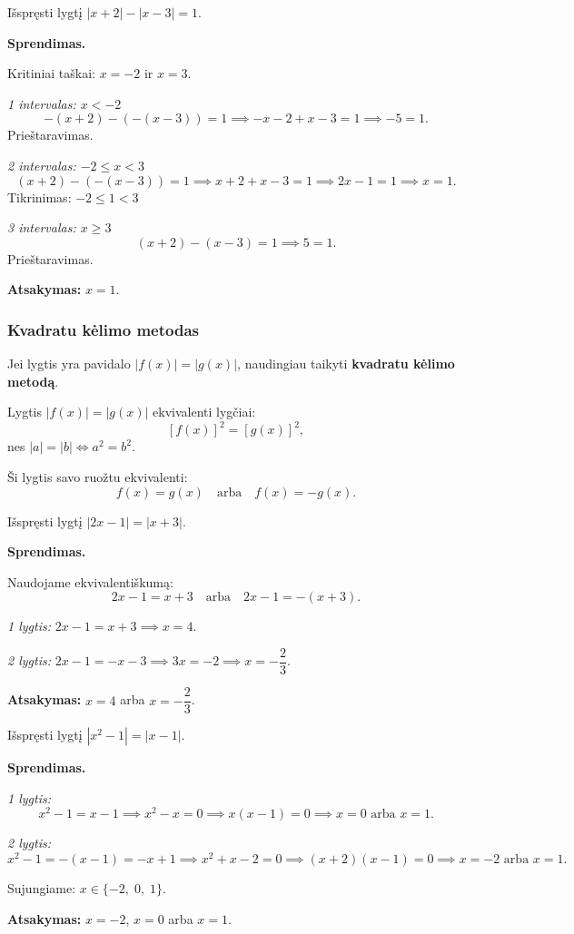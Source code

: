 \begin{example}
Išspręsti lygtį $|x + 2| - |x - 3| = 1$.

\textbf{Sprendimas.}

Kritiniai taškai: $x = -2$ ir $x = 3$.

\textit{1 intervalas: $x < -2$}
\[
-(x+2) - (-(x-3)) = 1 \implies -x-2+x-3 = 1 \implies -5 = 1.
\]
Prieštaravimas.

\textit{2 intervalas: $-2 \leq x < 3$}
\[
(x+2) - (-(x-3)) = 1 \implies x+2+x-3 = 1 \implies 2x - 1 = 1 \implies x = 1.
\]
Tikrinimas: $-2 \leq 1 < 3$ \checkmark

\textit{3 intervalas: $x \geq 3$}
\[
(x+2) - (x-3) = 1 \implies 5 = 1.
\]
Prieštaravimas.

\textbf{Atsakymas:} $x = 1$.
\end{example}

\subsubsection{Kvadratu kėlimo metodas}

Jei lygtis yra pavidalo $|f(x)| = |g(x)|$, naudingiau taikyti \textbf{kvadratu kėlimo metodą}.

\begin{theorem}
Lygtis $|f(x)| = |g(x)|$ ekvivalenti lygčiai:
\[
[f(x)]^2 = [g(x)]^2,
\]
nes $|a| = |b| \iff a^2 = b^2$.

Ši lygtis savo ruožtu ekvivalenti:
\[
f(x) = g(x) \quad \text{arba} \quad f(x) = -g(x).
\]
\end{theorem}

\begin{example}
Išspręsti lygtį $|2x - 1| = |x + 3|$.

\textbf{Sprendimas.}

Naudojame ekvivalentiškumą:
\[
2x - 1 = x + 3 \quad \text{arba} \quad 2x - 1 = -(x + 3).
\]

\textit{1 lygtis:} $2x - 1 = x + 3 \implies x = 4$.

\textit{2 lygtis:} $2x - 1 = -x - 3 \implies 3x = -2 \implies x = -\dfrac{2}{3}$.

\textbf{Atsakymas:} $x = 4$ arba $x = -\dfrac{2}{3}$.
\end{example}

\begin{example}
Išspręsti lygtį $|x^2 - 1| = |x - 1|$.

\textbf{Sprendimas.}

\textit{1 lygtis:}
\[
x^2 - 1 = x - 1 \implies x^2 - x = 0 \implies x(x-1) = 0 \implies x = 0 \text{ arba } x = 1.
\]

\textit{2 lygtis:}
\[
x^2 - 1 = -(x-1) = -x + 1 \implies x^2 + x - 2 = 0 \implies (x+2)(x-1) = 0 \implies x = -2 \text{ arba } x = 1.
\]

Sujungiame: $x \in \{-2,\; 0,\; 1\}$.

\textbf{Atsakymas:} $x = -2$, $x = 0$ arba $x = 1$.
\end{example}

